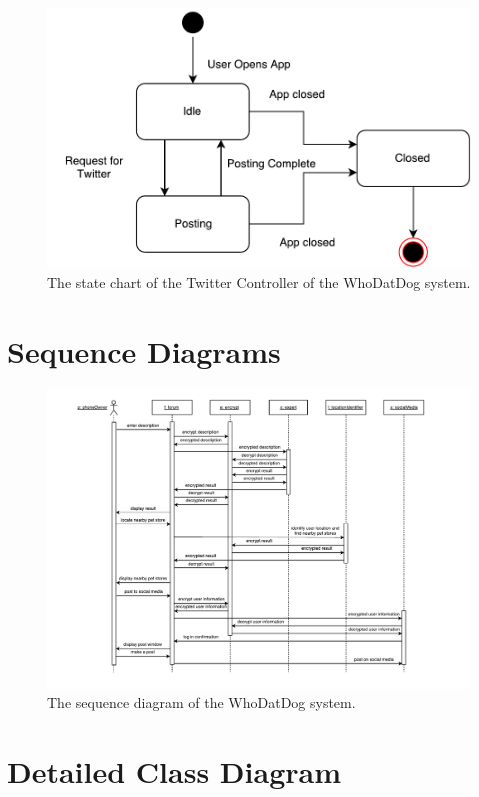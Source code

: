 \documentclass[]{article}
\begin{document}
\begin{figure}[H]
	\centering
	\includegraphics[width=\textwidth]{TwitterController.pdf}
	\caption{\label{fig:analysisclassdiagram}The state chart of the Twitter Controller of the WhoDatDog system.}
\end{figure}




\section{Sequence Diagrams}
\label{sec:sequence_diagrams}
\begin{figure}[H]
	\centering
	\includegraphics[width=\textwidth]{sequencediagram.pdf}
	\caption{\label{fig:analysisclassdiagram}The sequence diagram of the WhoDatDog system.}
\end{figure}

\section{Detailed Class Diagram}
\end{document}
